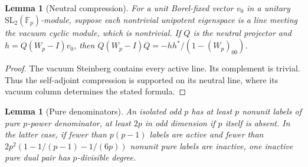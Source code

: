 \documentclass[11pt]{amsart}
\numberwithin{equation}{section}
\newtheorem{lemma}[theorem]{Lemma}
\theoremstyle{definition}
\theoremstyle{plain}
\begin{document}
\begin{lemma}[Neutral compression]\label{result:steinberg-compression}
For a unit Borel-fixed vector $v_0$ in a unitary
$\mathrm{SL}_2(\mathbb F_p)$-module, suppose each nontrivial unipotent
eigenspace is a line meeting the vacuum cyclic module, which is nontrivial.
If $Q$ is the neutral projector and $h=Q(W_p-I)v_0$, then
$Q(W_p-I)Q=-hh^*/(1-(W_p)_{00})$.
\end{lemma}
\begin{proof}
The vacuum Steinberg contains every active line. Its complement is
trivial. Thus the self-adjoint compression is supported on its
neutral line, where its vacuum column determines the stated formula.
\end{proof}

\begin{lemma}[Pure denominators]\label{odd:inactive-pure}
An isolated odd $p$ has at least $p$ nonunit labels of pure
$p$-power denominator, at least $2p$ in odd dimension if $p$
itself is absent. In the latter case, if fewer than $p(p-1)$ labels
are active and fewer than $2p^2(1-1/(p-1)-1/(6p))$ nonunit pure
labels are inactive, one inactive pure dual pair has $p$-divisible degree.
\end{lemma}
\end{document}
